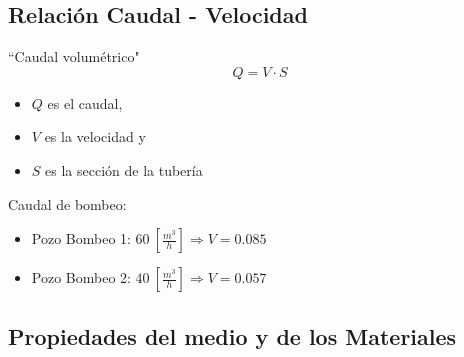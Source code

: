 \documentclass[spanish]{beamer}
\begin{document}
\subsection{Relación Caudal - Velocidad}
\begin{frame}{``Caudal volumétrico"}
\begin{equation}
Q=V \cdot S
\label{caudal}
\end{equation}
\begin{itemize}
\item $Q$ es el caudal,
\item $V$ es la velocidad y 
\item $S$ es la sección de la tubería
\end{itemize}
Caudal de bombeo:
	\begin{itemize}
		\item Pozo Bombeo 1: $60~\left[\frac{m^3}{h}\right] \Longrightarrow V=0.085$
		\item Pozo Bombeo 2: $40~\left[\frac{m^3}{h}\right] \Longrightarrow V=0.057$
	\end{itemize}
\end{frame}
\subsection{Propiedades del medio y de los Materiales}
\end{document}
